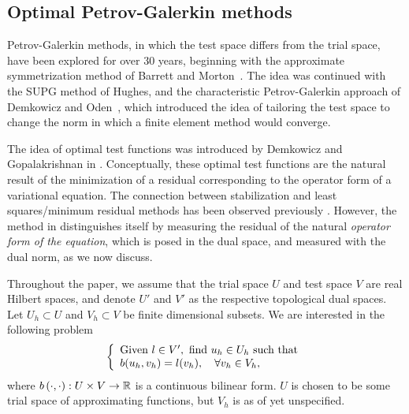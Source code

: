\subsection{Optimal Petrov-Galerkin methods}

 Petrov-Galerkin methods, in which the test space differs from the trial space, have been explored for over 30 years, beginning with the approximate symmetrization method of Barrett and
Morton~\cite{BARRETT01101981}. The idea was continued with the SUPG method of Hughes, and the characteristic Petrov-Galerkin approach of Demkowicz and Oden~\cite{Demkowicz1986188}, which introduced the
idea of tailoring the test space to change the norm in which a finite element method would converge.

The idea of optimal test functions was introduced by Demkowicz and Gopalakrishnan in \cite{DPG2}.  Conceptually, these optimal test functions are the natural result of the minimization of a residual corresponding to the operator form of a variational equation. The connection between stabilization and least squares/minimum residual methods has been observed previously \cite{GLS}. However, the method in \cite{DPG2} distinguishes itself by measuring the residual of the natural \textit{operator form of the equation}, which is posed in the dual space, and measured with the dual norm, as we now discuss. 	

Throughout the paper, we assume that the trial space $U$ and test space $V$ are real Hilbert spaces, and denote $U'$ and $V'$ as the respective topological dual spaces. Let $U_h \subset U$ and $V_h\subset V$ be finite dimensional subsets. We are interested in the following problem  
\begin{equation}
\eqnlab{variationEq}
\left\{
  \begin{array}{l}
    \text{Given } l \in V', \text{ find } u_h \in U_h  \text{ such that} \\ 
    b(u_h,v_h) = l(v_h), \quad \forall v_h\in V_h,
  \end{array}
  \right.
\end{equation}
where $b\LRp{\cdot,\cdot}: U \times V \to \mbb{R}$ is a continuous
bilinear form.  $U$ is chosen to be some trial space of approximating functions, but $V_h$ is as of yet unspecified. 

